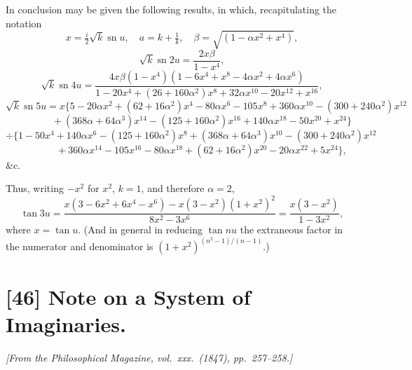 \documentclass[12pt,a4paper]{article}
\begin{document}
In conclusion may be given the following results, in which, recapitulating the notation
\[
x = \tfrac{i}{2}\sqrt{k}\operatorname{sn} u,\quad a = k + \tfrac{1}{k},\quad \beta = \sqrt{(1 - \alpha x^2 + x^4)},
\]
\[
\sqrt{k}\operatorname{sn} 2u = \frac{2x\beta}{1 - x^4},
\]
\[
\sqrt{k}\operatorname{sn} 4u = \frac{4x\beta(1 - x^4)(1 - 6x^4 + x^8 - 4\alpha x^2 + 4\alpha x^6)}{1 - 20x^4 + (26 + 160\alpha^2)x^8 + 32\alpha x^{10} - 20x^{12} + x^{16}},
\]
\[
\sqrt{k}\operatorname{sn} 5u = x\bigl\{5 - 20\alpha x^2 + (62 + 16\alpha^2)x^4 - 80\alpha x^6 - 105 x^8 + 360\alpha x^{10} - (300 + 240\alpha^2)x^{12}
\]
\[
\qquad\qquad + (368\alpha + 64\alpha^3)x^{14} - (125 + 160\alpha^2)x^{16} + 140 \alpha x^{18} - 50 x^{20} + x^{24}\bigr\}
\]
\[
\div\bigl\{1 - 50 x^4 + 140\alpha x^6 - (125 + 160\alpha^2)x^8 + (368\alpha + 64\alpha^3)x^{10} - (300 + 240\alpha^2)x^{12}
\]
\[
\qquad\qquad + 360\alpha x^{14} - 105 x^{16} - 80 \alpha x^{18} + (62 + 16\alpha^2)x^{20} - 20\alpha x^{22} + 5 x^{24}\bigr\},
\]
\&c.

Thus, writing $-x^2$ for $x^2$, $k = 1$, and therefore $\alpha = 2$,
\[
\tan 3u = \frac{x(3 - 6x^2 + 6x^4 - x^6) - x(3 - x^2)(1 + x^2)^2}{8x^2 - 3x^6} = \frac{x(3 - x^2)}{1 - 3x^2},
\]
where $x = \tan u$. (And in general in reducing $\tan nu$ the extraneous factor in the numerator and denominator is $(1 + x^2)^{(n^2 - 1)/(n - 1)}$.)

\newpage

\section*{[46] Note on a System of Imaginaries.}

\textit{[From the Philosophical Magazine, vol.~xxx.~(1847), pp.~257--258.]}

\bigskip
\end{document}
